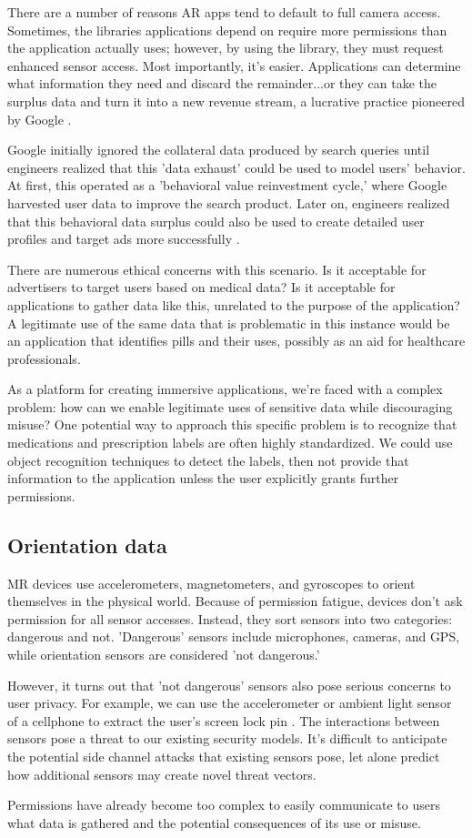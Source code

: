 There are a number of reasons AR apps tend to default to full camera access. Sometimes, the libraries applications depend on require more permissions than the application actually uses; however, by using the library, they must request enhanced sensor access. Most importantly, it's easier. Applications can determine what information they need and discard the remainder...or they can take the surplus data and turn it into a new revenue stream, a lucrative practice pioneered by Google \cite{zuboff2019age}.

Google initially ignored the collateral data produced by search queries until engineers realized that this 'data exhaust' could be used to model users' behavior. At first, this operated as a 'behavioral value reinvestment cycle,' where Google harvested user data to improve the search product. Later on, engineers realized that this behavioral data surplus could also be used to create detailed user profiles and target ads more successfully \cite{patent2003targetedad}.

There are numerous ethical concerns with this scenario. Is it acceptable for advertisers to target users based on medical data? Is it acceptable for applications to gather data like this, unrelated to the purpose of the application?  A legitimate use of the same data that is problematic in this instance would be an application that identifies pills and their uses, possibly as an aid for healthcare professionals.

As a platform for creating immersive applications, we're faced with a complex problem: how can we enable legitimate uses of sensitive data while discouraging misuse? One potential way to approach this specific problem is to recognize that medications and prescription labels are often highly standardized. We could use object recognition techniques to detect the labels, then not provide that information to the application unless the user explicitly grants further permissions.

\subsection{Orientation data}

MR devices use accelerometers, magnetometers, and gyroscopes to orient themselves in the physical world. Because of permission fatigue, devices don't ask permission for all sensor accesses. Instead, they sort sensors into two categories: dangerous and not. 'Dangerous' sensors include microphones, cameras, and GPS, while orientation sensors are considered 'not dangerous.'

However, it turns out that 'not dangerous' sensors also pose serious concerns to user privacy. For example, we can use the accelerometer or ambient light sensor of a cellphone to extract the user's screen lock pin \cite{aviv2012practicality} \cite{spreitzer2018systematic}. The interactions between sensors pose a threat to our existing security models. It's difficult to anticipate the potential side channel attacks that existing sensors pose, let alone predict how additional sensors may create novel threat vectors.

Permissions have already become too complex to easily communicate to users what data is gathered and the potential consequences of its use or misuse.
